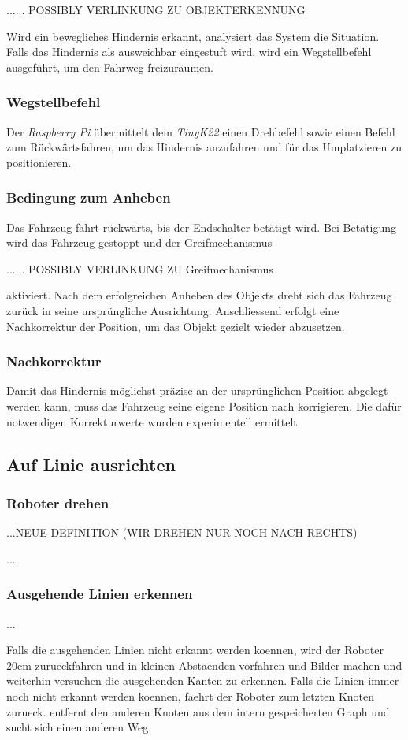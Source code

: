 ...... POSSIBLY VERLINKUNG ZU OBJEKTERKENNUNG

Wird ein bewegliches Hindernis erkannt, analysiert das System die Situation. Falls das Hindernis als ausweichbar eingestuft wird, wird ein Wegstellbefehl ausgeführt, um den Fahrweg freizuräumen.

\subsubsection{Wegstellbefehl}
Der \textit{Raspberry Pi} übermittelt dem \textit{TinyK22} einen Drehbefehl sowie einen Befehl zum Rückwärtsfahren, um das Hindernis anzufahren und für das Umplatzieren zu positionieren.

\subsubsection{Bedingung zum Anheben}
Das Fahrzeug fährt rückwärts, bis der Endschalter betätigt wird. Bei Betätigung wird das Fahrzeug gestoppt und der Greifmechanismus

...... POSSIBLY VERLINKUNG ZU Greifmechanismus

aktiviert. Nach dem erfolgreichen Anheben des Objekts dreht sich das Fahrzeug zurück in seine ursprüngliche Ausrichtung. Anschliessend erfolgt eine Nachkorrektur der Position, um das Objekt gezielt wieder abzusetzen.

\subsubsection{Nachkorrektur}
Damit das Hindernis möglichst präzise an der ursprünglichen Position abgelegt werden kann, muss das Fahrzeug seine eigene Position nach korrigieren. Die dafür notwendigen Korrekturwerte wurden experimentell ermittelt.


\newpage
\subsection{Auf Linie ausrichten}

\subsubsection{Roboter drehen}

...NEUE DEFINITION (WIR DREHEN NUR NOCH NACH RECHTS)

...

\subsubsection{Ausgehende Linien erkennen}
\label{outgoing-lines}

...

Falls die ausgehenden Linien nicht erkannt werden koennen, wird der Roboter 20cm zurueckfahren und in kleinen Abstaenden vorfahren und Bilder machen und weiterhin versuchen die ausgehenden Kanten zu erkennen. Falls die Linien immer noch nicht erkannt werden koennen, faehrt der Roboter zum letzten Knoten zurueck. entfernt den anderen Knoten aus dem intern gespeicherten Graph und sucht sich einen anderen Weg.